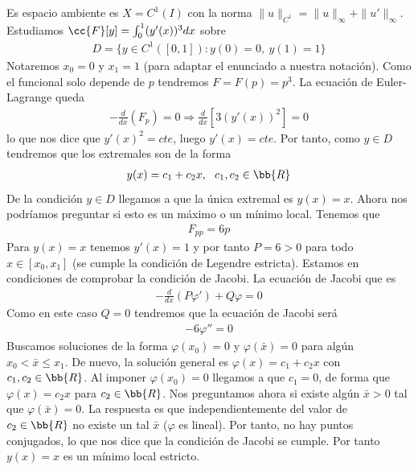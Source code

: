 \begin{ejemplo}
    Es espacio ambiente es $X=C^1(I)$ con la norma $\|u\|_{C^1} = \|u\|_\infty + \|u'\|_\infty$. Estudiamos $\cc{F}[y] = \int_0^1 (y'(x))^3dx$ sobre
    \begin{gather*}
        D=\{y\in C^1([0,1]) : y(0)=0,\ y(1)=1\}
    \end{gather*}
    Notaremos $x_0=0$ y $x_1=1$ (para adaptar el enunciado a nuestra notación). Como el funcional solo depende de $p$ tendremos $F=F(p)=p^3$. La ecuación de Euler-Lagrange queda
    \begin{gather*}
        -\frac{d}{dx}(F_p) = 0 \Rightarrow \frac{d}{dx} [3(y'(x))^2] = 0
    \end{gather*}
    lo que nos dice que $y'(x)^2 = cte$, luego $y'(x)=cte$. Por tanto, como $y\in D$ tendremos que los extremales son de la forma
    \begin{gather*}
        y(x)=c_1 + c_2x,\ \ c_1,c_2\in \bb{R}
    \end{gather*}
    De la condición $y\in D$ llegamos a que la única extremal es $y(x)=x$. Ahora nos podríamos preguntar si esto es un máximo o un mínimo local. Tenemos que 
    \begin{gather*}
        F_{pp} = 6p
    \end{gather*}
    Para $y(x)=x$ tenemos $y'(x)=1$ y por tanto $P=6>0$ para todo $x\in [x_0, x_1]$ (se cumple la condición de Legendre estricta). Estamos en condiciones de comprobar la condición de Jacobi. La ecuación de Jacobi que es
    \begin{gather*}
        -\frac{d}{dx}(P\varphi') + Q\varphi = 0
    \end{gather*}
    Como en este caso $Q=0$ tendremos que la ecuación de Jacobi será
    \begin{gather*}
        -6\varphi''=0
    \end{gather*}
    Buscamos soluciones de la forma $\varphi(x_0)=0$ y $\varphi(\bar{x})=0$ para algún $x_0<\bar{x}\leq x_1$. De nuevo, la solución general es $\varphi(x)=c_1+c_2x$ con $c_1,c_2\in \bb{R}$. Al imponer $\varphi(x_0)=0$ llegamos a que $c_1=0$, de forma que $\varphi(x)=c_2x$ para $c_2\in \bb{R}$. Nos preguntamos ahora si existe algún $\bar{x}>0$ tal que $\varphi(\bar{x})=0$. La respuesta es que independientemente del valor de $c_2\in \bb{R}$ no existe un tal $\bar{x}$ ($\varphi$ es lineal). Por tanto, no hay puntos conjugados, lo que nos dice que la condición de Jacobi se cumple. Por tanto $y(x)=x$ es un mínimo local estricto.
\end{ejemplo}

